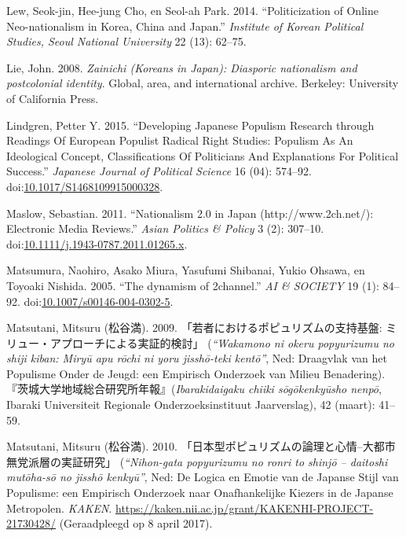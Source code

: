 \documentclass[10.5pt,dutch,]{article}
\begin{document}
\hypertarget{ref-lewux5fpoliticizationux5f2014}{}
Lew, Seok-jin, Hee-jung Cho, en Seol-ah Park. 2014. “Politicization of
Online Neo-nationalism in Korea, China and Japan.”  \emph{Institute of
Korean Political Studies, Seoul National University} 22 (13): 62--75.

\hypertarget{ref-lieux5fzainichiux5f2008}{}
Lie, John. 2008. \emph{Zainichi (Koreans in Japan): Diasporic
nationalism and postcolonial identity}. Global, area, and international
archive. Berkeley: University of California Press.

\hypertarget{ref-lindgrenux5fdevelopingux5f2015}{}
Lindgren, Petter Y. 2015. “Developing Japanese Populism Research through
Readings Of European Populist Radical Right Studies: Populism As An
Ideological Concept, Classifications Of Politicians And Explanations For
Political Success.” \emph{Japanese Journal of Political Science} 16 (04):
574--92.
doi:\href{https://doi.org/10.1017/S1468109915000328}{10.1017/S1468109915000328}.

\hypertarget{ref-maslowux5fnationalismux5f2011-1}{}
Maslow, Sebastian. 2011. “Nationalism 2.0 in Japan (http://www.2ch.net/):
Electronic Media Reviews.”  \emph{Asian Politics \& Policy} 3 (2):
307--10.
doi:\href{https://doi.org/10.1111/j.1943-0787.2011.01265.x}{10.1111/j.1943-0787.2011.01265.x}.

\hypertarget{ref-matsumuraux5fdynamismux5f2005}{}
Matsumura, Naohiro, Asako Miura, Yasufumi Shibanai, Yukio Ohsawa, en
Toyoaki Nishida. 2005. “The dynamism of 2channel.”  \emph{AI \& SOCIETY} 19
(1): 84--92.
doi:\href{https://doi.org/10.1007/s00146-004-0302-5}{10.1007/s00146-004-0302-5}.

\hypertarget{ref-matsutaniux5fwakamonoux5f2009}{}
Matsutani, Mitsuru (松谷満). 2009. 「若者におけるポピュリズムの支持基盤: ミリュー・アプローチによる実証的検討」 (\emph{“Wakamono ni okeru popyurizumu no shiji kiban: Miryū apu rōchi ni yoru jisshō-teki kentō”}, Ned: Draagvlak van het Populisme Onder de Jeugd: een Empirisch Onderzoek van Milieu Benadering).  『茨城大学地域総合研究所年報』(\emph{Ibarakidaigaku chiiki sōgōkenkyūsho nenpō}, Ibaraki Universiteit Regionale Onderzoeksinstituut Jaarverslag), 42 (maart): 41–59.

\hypertarget{ref-matsutaniux5fnihon-gataux5f2010}{}
Matsutani, Mitsuru (松谷満). 2010. 「日本型ポピュリズムの論理と心情--大都市無党派層の実証研究」 (\emph{“Nihon-gata popyurizumu no ronri to shinjō -- daitoshi mutōha-sō no jisshō kenkyū”}, Ned: De Logica en Emotie van de Japanse Stijl van Populisme: een Empirisch Onderzoek naar Onafhankelijke Kiezers in de Japanse Metropolen. \emph{KAKEN}. \url{https://kaken.nii.ac.jp/grant/KAKENHI-PROJECT-21730428/} (Geraadpleegd op 8 april 2017).
\end{document}
